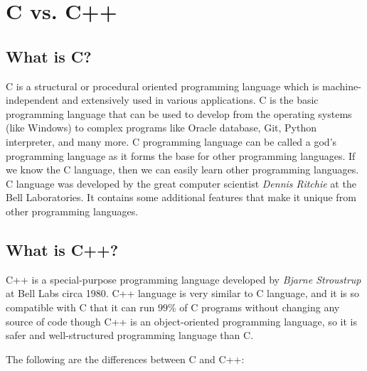\documentclass{book}
\begin{document}
\section{C vs. C++}

\subsection{What is C?}

C is a structural or procedural oriented programming language which is machine-independent and extensively used in various applications. C is the basic programming language that can be used to develop from the operating systems (like Windows) to complex programs like Oracle database, Git, Python interpreter, and many more. C programming language can be called a god's programming language as it forms the base for other programming languages. If we know the C language, then we can easily learn other programming languages. C language was developed by the great computer scientist \textit{Dennis Ritchie} at the Bell Laboratories. It contains some additional features that make it unique from other programming languages.

\subsection{What is C++?}

C++ is a special-purpose programming language developed by \textit{Bjarne Stroustrup} at Bell Labs circa 1980. C++ language is very similar to C language, and it is so compatible with C that it can run $99\%$ of C programs without changing any source of code though C++ is an object-oriented programming language, so it is safer and well-structured programming language than C.

The following are the differences between C and C++:
\end{document}
